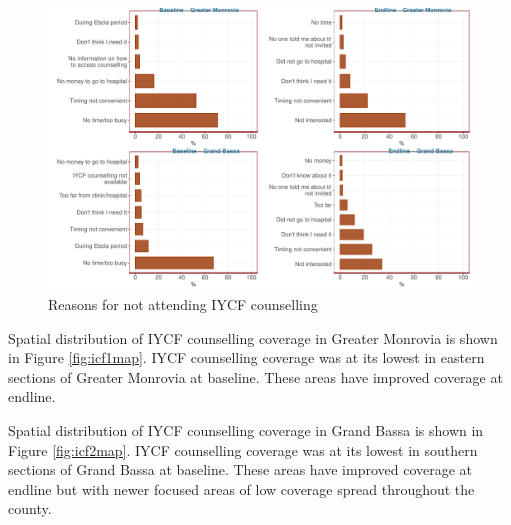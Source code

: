 \documentclass[12pt,a4paper]{article}
\begin{document}
\begin{figure}[H]

{\centering \includegraphics{liberiaCoverageFinalReport_files/figure-latex/icf2table-1} 

}

\caption{Reasons for not attending IYCF counselling}\label{fig:icf2table}
\end{figure}

Spatial distribution of IYCF counselling coverage in Greater Monrovia is shown in Figure \ref{fig:icf1map}. IYCF counselling coverage was at its lowest in eastern sections of Greater Monrovia at baseline. These areas have improved coverage at endline.

Spatial distribution of IYCF counselling coverage in Grand Bassa is shown in Figure \ref{fig:icf2map}. IYCF counselling coverage was at its lowest in southern sections of Grand Bassa at baseline. These areas have improved coverage at endline but with newer focused areas of low coverage spread throughout the county.
\end{document}
